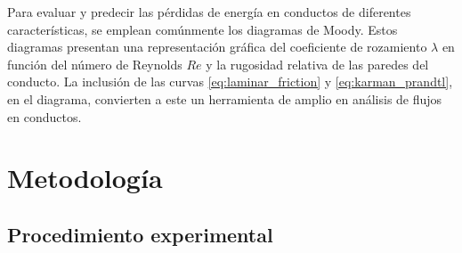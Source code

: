 	Para evaluar y predecir las pérdidas de energía en conductos de diferentes características, se emplean comúnmente los diagramas de Moody. Estos diagramas presentan una representación gráfica del coeficiente de rozamiento \( \lambda \) en función del número de Reynolds \( Re \) y la rugosidad relativa de las paredes del conducto. La inclusión de las curvas \ref{eq:laminar_friction} y \ref{eq:karman_prandtl}, en el diagrama, convierten a este un herramienta de amplio en análisis de flujos en conductos.
	

	\section{Metodología}
	
	
	\subsection{Procedimiento experimental}

